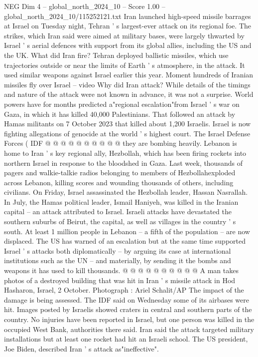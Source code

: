 \begin{textsample}{NEG Dim 4 – global\_north\_2024\_10 – Score 1.00 – global\_north\_2024\_10/115252121.txt}  \label{ex:f4_neg_059}
Iran launched high-speed missile barrages at Israel on Tuesday night, Tehran ' s largest-ever attack on its regional foe.
The strikes, which Iran said were aimed at military bases, were largely thwarted by Israel ' s aerial defences with support from its global allies, including the US and the UK.
What did Iran fire?
Tehran deployed ballistic missiles, which use trajectories outside or near the limits of Earth ' s atmosphere, in the attack.
It used similar weapons against Israel earlier this year.
Moment hundreds of Iranian missiles fly over Israel -- video Why did Iran attack?
While details of the timings and nature of the attack were not known in advance, it was not a surprise.
World powers have for months predicted a"regional escalation"from Israel ' s war on Gaza, in which it has killed 40,000 Palestinians.
That followed an attack by Hamas militants on 7 October 2023 that killed about 1,200 Israelis.
Israel is now fighting allegations of genocide at the world ' s highest court.
The Israel Defense Forces ( IDF @ @ @ @ @ @ @ @ @ @ they are bombing heavily.
Lebanon is home to Iran ' s key regional ally, Hezbollah, which has been firing rockets into northern Israel in response to the bloodshed in Gaza.
Last week, thousands of pagers and walkie-talkie radios belonging to members of Hezbollahexploded across Lebanon, killing scores and wounding thousands of others, including civilians.
On Friday, Israel assassinated the Hezbollah leader, Hassan Nasrallah.
In July, the Hamas political leader, Ismail Haniyeh, was killed in the Iranian capital -- an attack attributed to Israel.
Israeli attacks have devastated the southern suburbs of Beirut, the capital, as well as villages in the country ' s south.
At least 1 million people in Lebanon -- a fifth of the population -- are now displaced.
The US has warned of an escalation but at the same time supported Israel ' s attacks both diplomatically -- by arguing its case at international institutions such as the UN -- and materially, by sending it the bombs and weapons it has used to kill thousands. @ @ @ @ @ @ @ @ @ @ A man takes photos of a destroyed building that was hit in Iran ' s missile attack in Hod Hasharon, Israel, 2 October.
Photograph : Ariel Schalit/AP The impact of the damage is being assessed.
The IDF said on Wednesday some of its airbases were hit.
Images posted by Israelis showed craters in central and southern parts of the country.
No injuries have been reported in Israel, but one person was killed in the occupied West Bank, authorities there said.
Iran said the attack targeted military installations but at least one rocket had hit an Israeli school.
The US president, Joe Biden, described Iran ' s attack as"ineffective".

\end{textsample}

